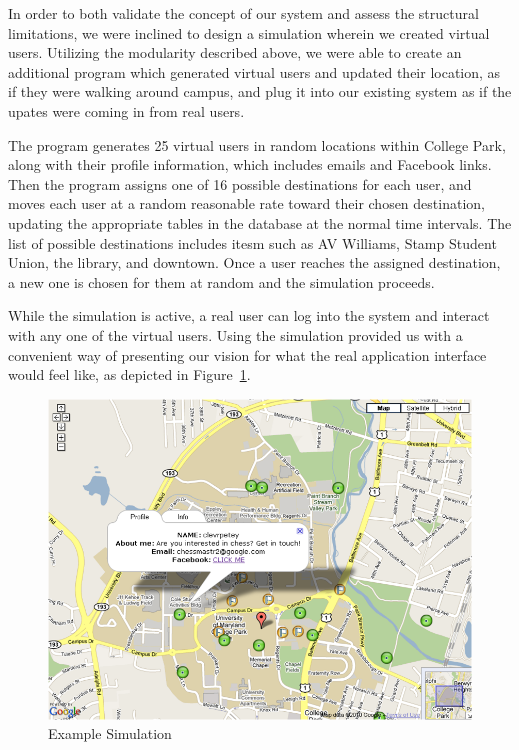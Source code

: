 \documentclass[11pt]{article}
\begin{document}
In order to both validate the concept of our system and assess the
structural limitations, we were inclined to design a simulation wherein we
created virtual users. Utilizing the modularity described above, we were
able to create an additional program which generated virtual users and
updated their location, as if they were walking around campus, and plug it
into our existing system as if the upates were coming in from real users.

The program generates 25 virtual users in random locations within
College Park, along with their profile information, which includes
emails and Facebook links. Then the program assigns one of 16 possible
destinations for each user, and moves each user at a random reasonable
rate toward their chosen destination, updating the appropriate tables
in the database at the normal time intervals. The list of possible
destinations includes itesm such as AV Williams, Stamp Student Union,
the library, and downtown. Once a user reaches the assigned destination,
a new one is chosen for them at random and the simulation proceeds.

While the simulation is active, a real user can log into the system
and interact with any one of the virtual users. Using the simulation
provided us with a convenient way of presenting our vision for
what the real application interface would feel like, as depicted in
Figure~\ref{fig:sim1}.


\begin{figure}[h]
\begin{center}
  \includegraphics[scale=0.5]{sim1.png}
\caption{Example Simulation}
\label{fig:sim1} 
\end{center}
\end{figure}
\end{document}
